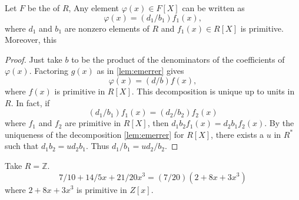\documentclass{article}
\begin{document}
\begin{cora}\label{cor:ienfad}
Let  $F$ be the  of  $R$, Any element $\varphi(x) \in F[X]$ can be written as $$\varphi(x)=\left(d_{1} / b_{1}\right) f_{1}(x),$$ where $d_1$ and $b_1$ are nonzero elements of $R$ and $f_1(x) \in R[X]$ is primitive.  Moreover, this 
\end{cora}
\begin{proof}
Just take $b$ to be the product of the denominators of the coefficients of $\varphi(x)$. Factoring $g(x)$ as in \cref{lem:emerrer} gives
$$
\varphi(x)=(d / b) f(x),
$$
where $f(x)$ is primitive in $R[X]$. This decomposition is unique up to units in $R$. In fact, if
$$
\left(d_{1} / b_{1}\right) f_{1}(x)=\left(d_{2} / b_{2}\right) f_{2}(x)
$$
where $f_{1}$ and $f_{2}$ are primitive in $R[X]$, then $d_{1} b_{2} f_{1}(x)=d_{2} b_{1} f_{2}(x)$. By the uniqueness of the decomposition \cref{lem:emerrer} for $R[X]$, there exists a  $u$ in $R^{*}$ such that $d_{1} b_{2}=u d_{2} b_{1}$. Thus $d_{1} / b_{1}=u d_{2} / b_{2}$.
\end{proof}

\begin{exma}
 Take $R=\mathbb{Z}$.
$$
7 / 10+14 / 5 x+21 / 20 x^{3}=(7 / 20)\left(2+8 x+3 x^{3}\right)
$$
where $2+8 x+3 x^{3}$ is primitive in $Z[x]$.
\end{exma}
\end{document}
